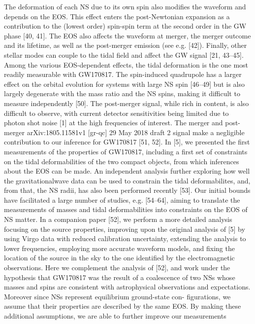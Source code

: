 \documentclass{ut-thesis}
\begin{document}
The deformation of each NS due to its own spin also modifies
the waveform and depends on the EOS. This effect
enters the post-Newtonian expansion as a contribution to
the (lowest order) spin-spin term at the second order in the
GW phase [40, 41]. The EOS also affects the waveform
at merger, the merger outcome and its lifetime, as well as
the post-merger emission (see e.g. [42]). Finally, other stellar
modes can couple to the tidal field and affect the GW
signal [21, 43–45].
Among the various EOS-dependent effects, the tidal
deformation is the one most readily measurable with
GW170817. The spin-induced quadrupole has a larger effect
on the orbital evolution for systems with large NS spin
[46–49] but is also largely degenerate with the mass ratio
and the NS spins, making it difficult to measure independently
[50]. The post-merger signal, while rich in content,
is also difficult to observe, with current detector sensitivities
being limited due to photon shot noise [1] at the
high frequencies of interest. The merger and post-merger
arXiv:1805.11581v1 [gr-qc] 29 May 2018
draft
2
signal make a negligible contribution to our inference for
GW170817 [51, 52].
In [5], we presented the first measurements of the properties
of GW170817, including a first set of constraints on
the tidal deformabilities of the two compact objects, from
which inferences about the EOS can be made. An independent
analysis further exploring how well the gravitationalwave
data can be used to constrain the tidal deformabilites,
and, from that, the NS radii, has also been performed recently
[53]. Our initial bounds have facilitated a large
number of studies, e.g. [54–64], aiming to translate the
measurements of masses and tidal deformabilities into constraints
on the EOS of NS matter. In a companion paper
[52], we perform a more detailed analysis focusing on
the source properties, improving upon the original analysis
of [5] by using Virgo data with reduced calibration uncertainty,
extending the analysis to lower frequencies, employing
more accurate waveform models, and fixing the location
of the source in the sky to the one identified by the
electromagnetic observations.
Here we complement the analysis of [52], and work under
the hypothesis that GW170817 was the result of a coalescence
of two NSs whose masses and spins are consistent
with astrophysical observations and expectations. Moreover
since NSs represent equilibrium ground-state con-
figurations, we assume that their properties are described
by the same EOS. By making these additional assumptions,
we are able to further improve our measurements
\end{document}
